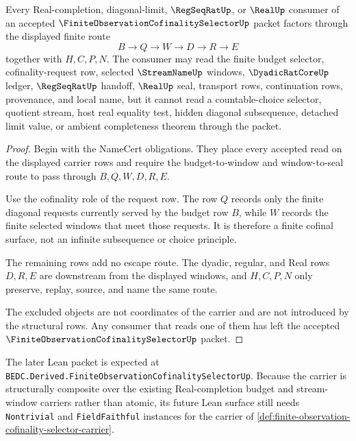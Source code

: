 \begin{theorem}
\label{thm:finite-observation-cofinality-selector-nonescape}
Every Real-completion, diagonal-limit, $\RegSeqRatUp$, or $\RealUp$ consumer of an accepted $\FiniteObservationCofinalitySelectorUp$ packet factors through the displayed finite route
$$
B \to Q \to W \to D \to R \to E
$$
together with $H,C,P,N$. The consumer may read the finite budget selector, cofinality-request row, selected $\StreamNameUp$ windows, $\DyadicRatCoreUp$ ledger, $\RegSeqRatUp$ handoff, $\RealUp$ seal, transport rows, continuation rows, provenance, and local name, but it cannot read a countable-choice selector, quotient stream, host real equality test, hidden diagonal subsequence, detached limit value, or ambient completeness theorem through the packet.
\end{theorem}
\begin{proof}
Begin with the NameCert obligations. They place every accepted read on the displayed carrier rows and require the budget-to-window and window-to-seal route to pass through $B,Q,W,D,R,E$.

Use the cofinality role of the request row. The row $Q$ records only the finite diagonal requests currently served by the budget row $B$, while $W$ records the finite selected windows that meet those requests. It is therefore a finite cofinal surface, not an infinite subsequence or choice principle.

The remaining rows add no escape route. The dyadic, regular, and Real rows $D,R,E$ are downstream from the displayed windows, and $H,C,P,N$ only preserve, replay, source, and name the same route.

The excluded objects are not coordinates of the carrier and are not introduced by the structural rows. Any consumer that reads one of them has left the accepted $\FiniteObservationCofinalitySelectorUp$ packet.
\end{proof}

The later Lean packet is expected at \texttt{BEDC.Derived.FiniteObservationCofinalitySelectorUp}. Because the carrier is structurally composite over the existing Real-completion budget and stream-window carriers rather than atomic, its future Lean surface still needs \texttt{Nontrivial} and \texttt{FieldFaithful} instances for the carrier of \autoref{def:finite-observation-cofinality-selector-carrier}.


